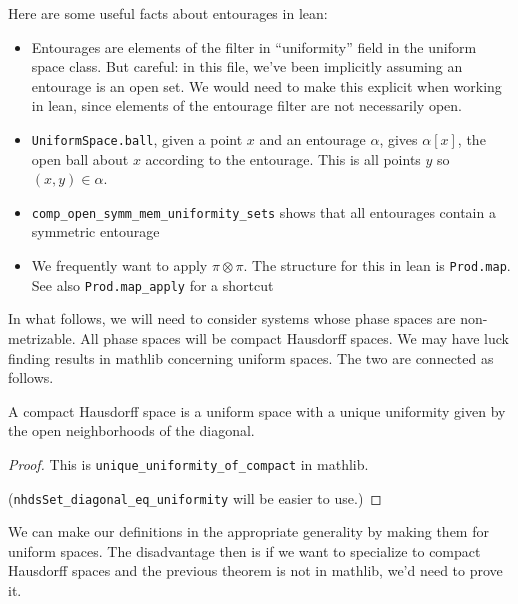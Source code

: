 \begin{leanrmk}
    Here are some useful facts about entourages in lean:
    \begin{itemize}
        \item Entourages are elements of the filter in ``uniformity'' field in the uniform space class. But careful: in this file, we've been implicitly assuming an entourage is an open set. We would need to make this explicit when working in lean, since elements of the entourage filter are not necessarily open.  

        \item \verb|UniformSpace.ball|, given a point $x$ and an entourage $\alpha$, gives $\alpha[x]$, the open ball about $x$ according to the entourage.  This is all points $y$ so $(x,y) \in \alpha$.

        \item \verb|comp_open_symm_mem_uniformity_sets| shows that all entourages contain a symmetric entourage

        \item We frequently want to apply $\pi \otimes \pi$.  The structure for this in lean is \verb|Prod.map|.  See also \verb|Prod.map_apply| for a shortcut
    \end{itemize}
\end{leanrmk}

In what follows, we will need to consider systems whose phase spaces are non-metrizable.  All phase spaces will be compact Hausdorff spaces.  We may have luck finding results in mathlib concerning uniform spaces.  The two are connected as follows.

\begin{theorem}
    A compact Hausdorff space is a uniform space with a unique uniformity given by the open neighborhoods of the diagonal.
\end{theorem}

\begin{proof}
\leanok{}
    This is \verb|unique_uniformity_of_compact| in mathlib.

    (\verb|nhdsSet_diagonal_eq_uniformity| will be easier to use.)
\end{proof}

We can make our definitions in the appropriate generality by making them for uniform spaces.  The disadvantage then is if we want to specialize to compact Hausdorff spaces and the previous theorem is not in mathlib, we'd need to prove it.

